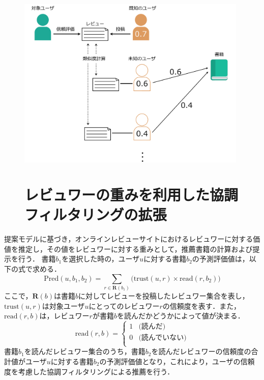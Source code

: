 \documentclass[a4paper,11pt,oneside,openany]{jsbook}
\begin{document}
\begin{figure}[tb]
	\begin{center} %
		\includegraphics[width = 110mm]{figures/model.pdf} %
	\end{center}
	
	
	\section{レビュワーの重みを利用した協調フィルタリングの拡張} %
	\label{fig:model} %
\end{figure}
提案モデルに基づき，オンラインレビューサイトにおけるレビュワーに対する価値を推定し，その値をレビュワーに対する重みとして，推薦書籍の計算および提示を行う．
書籍$b_{1}$を選択した時の，ユーザ$u$に対する書籍$b_{2}$の予測評価値は，以下の式で求める．
\begin{equation}
\mathrm{Pred}( u, b_{1}, b_{2} ) = \sum_{r\in{\mathbf{R}(b_{1})}}\bigl({\mathrm{trust}( u , r )}\times {\mathrm{read}( r , b_{2} )}\bigr)
\end{equation}
ここで，$\mathbf{R}(b)$は書籍$b$に対してレビューを投稿したレビュワー集合を表し，$\mathrm{trust}(u,r)$は対象ユーザ$u$にとってのレビュワー$r$の信頼度を表す．また，$\mathrm{read}(r,b)$は，レビュワー$r$が書籍$b$を読んだかどうかによって値が決まる．
\begin{equation}
	\mathrm{read}(r,b) =\left\{ \begin{array}{ll}
		1 & \mbox{(読んだ)} \\
		0 & \mbox{(読んでいない)} \\
	\end{array} \right.
\end{equation}
書籍$b_{1}$を読んだレビュワー集合のうち，書籍$b_{2}$を読んだレビュワーの信頼度の合計値がユーザ$u$に対する書籍$b_{2}$の予測評価値となり，これにより，ユーザの信頼度を考慮した協調フィルタリングによる推薦を行う．
\end{document}
